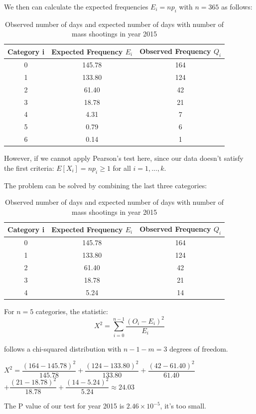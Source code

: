 \documentclass[12pt]{article}
\begin{document}
\par We then can calculate the expected frequencies $E_i=np_i$ with $n=365$ as follows:
\begin{table}[H]
\begin{center}
\begin{tabular*} {14cm} {@{\extracolsep{\fill} }ccc}
\toprule
Category i & Expected Frequency $E_i$ & Observed Frequency $Q_i$ \\
\midrule
0 & 145.78 & 164\\ \hline
1 & 133.80 & 124\\ \hline
2 & 61.40 & 42\\ \hline
3 & 18.78 & 21\\ \hline
4 & 4.31 &  7\\ \hline
5 & 0.79 &  6\\ \hline
6 & 0.14  & 1\\
\bottomrule
\end{tabular*}
\end{center}
\caption{Observed number of days and expected number of days with number of mass shootings in year 2015}
\end{table}
\par However, if we cannot apply Pearson's test here, since our data doesn't satisfy the first criteria: $E[X_i]=np_i\geq1$ for all $i=1,...,k$.
\par The problem can be solved by combining the last three categories:
\begin{table} [!htbp]
\begin{center}
\begin{tabular*} {14cm} {@{\extracolsep{\fill} }ccc}
\toprule
Category i & Expected Frequency $E_i$ & Observed Frequency $Q_i$ \\
\midrule
0 & 145.78 & 164\\ \hline
1 & 133.80 & 124\\ \hline
2 & 61.40 & 42\\ \hline
3 & 18.78 & 21\\ \hline
4 & 5.24 &  14\\
\bottomrule
\end{tabular*}
\end{center}
\caption{Observed number of days and expected number of days with number of mass shootings in year 2015}
\end{table}
\par For $n=5$ categories, the statistic:
\begin{equation*}
X^2=\sum_{i=0}^{n-1}\dfrac{(O_i-E_i)^2}{E_i}
\end{equation*}
\par follows a chi-squared distribution with $n-1-m=3$ degrees of freedom.
\begin{center}
$X^2=\dfrac{(164-145.78)^2}{145.78}+\dfrac{(124-133.80)^2}{133.80}+\dfrac{(42-61.40)^2}{61.40}$\\
$+\dfrac{(21-18.78)^2}{18.78}+\dfrac{(14-5.24)^2}{5.24}\approx24.03$
\end{center}
\par The P value of our test for year 2015 is $2.46\times10^{-5}$, it's too small.\\
\end{document}

